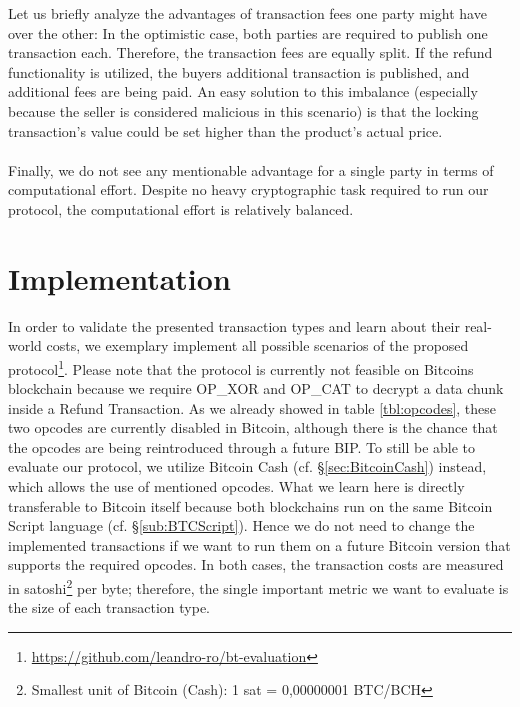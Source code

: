 \documentclass{cacthesis}
\newcounter{protocol}
\begin{document}
        Let us briefly analyze the advantages of transaction fees one party might have over the other: In the optimistic case, both parties are required to publish one transaction each. Therefore, the transaction fees are equally split. If the refund functionality is utilized, the buyers additional transaction is published, and additional fees are being paid. An easy solution to this imbalance (especially because the seller is considered malicious in this scenario) is that the locking transaction's value could be set higher than the product's actual price. \\\\
        Finally, we do not see any mentionable advantage for a single party in terms of computational effort. Despite no heavy cryptographic task required to run our protocol, the computational effort is relatively balanced. 
	    
	\chapter{Implementation}
	    In order to validate the presented transaction types and learn about their real-world costs, we exemplary implement all possible scenarios of the proposed protocol\footnote{\url{https://github.com/leandro-ro/bt-evaluation}}. Please note that the protocol is currently not feasible on Bitcoins blockchain because we require OP\_XOR and OP\_CAT to decrypt a data chunk inside a Refund Transaction. As we already showed in table \ref{tbl:opcodes}, these two opcodes are currently disabled in Bitcoin, although there is the chance that the opcodes are being reintroduced through a future BIP. To still be able to evaluate our protocol, we utilize Bitcoin Cash (cf. §\ref{sec:BitcoinCash}) instead, which allows the use of mentioned opcodes. What we learn here is directly transferable to Bitcoin itself because both blockchains run on the same Bitcoin Script language (cf. §\ref{sub:BTCScript}). Hence we do not need to change the implemented transactions if we want to run them on a future Bitcoin version that supports the required opcodes. In both cases, the transaction costs are measured in satoshi\footnote{Smallest unit of Bitcoin (Cash): 1 sat = 0,00000001 BTC/BCH} per byte; therefore, the single important metric we want to evaluate is the size of each transaction type. 
	    
\end{document}
